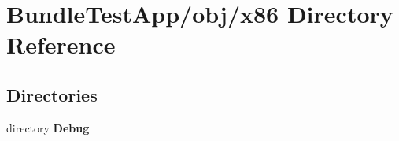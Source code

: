 \section{Bundle\+Test\+App/obj/x86 Directory Reference}
\label{dir_f3ce8ed253788d2884ec28c4ea04db31}
\subsection*{Directories}
\begin{DoxyCompactItemize}
\item 
directory {\bf Debug}
\end{DoxyCompactItemize}
